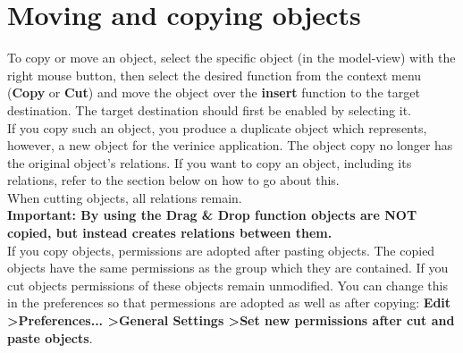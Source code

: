 \documentclass[a4paper,10pt]{book}
\begin{document}
\section{Moving and copying objects}
To copy or move an object, select the specific object (in the model-view) with the right mouse button, then select the desired function from the context menu (\textbf{Copy} or \textbf{Cut}) and move the object over the \textbf{insert} function to the target destination. The target destination should first be enabled by selecting it.
\newline\\
If you copy such an object, you produce a duplicate object which represents, however, a new object for the verinice application. The object copy no longer has the original object's relations. If you want to copy an object, including its relations, refer to the section below on how to go about this.
\newline\\
When cutting objects, all relations remain.
\newline\\
\textbf{Important: By using the Drag \& Drop function objects are NOT copied, but instead creates relations between them.}
\newline\\
If you copy objects, permissions are adopted after pasting objects. The copied objects have the same permissions as the group which they are contained. If you cut objects permissions of these objects remain unmodified. You can change this in the preferences so that permessions are adopted as well as after copying: \textbf{Edit \textgreater Preferences... \textgreater General Settings
  \textgreater Set new permissions after cut and paste objects}.


\newpage
\end{document}
